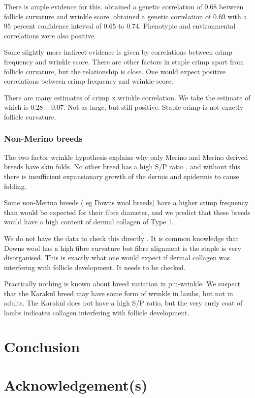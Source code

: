 \documentclass{article}
\begin{document}
There is ample evidence for this. \cite{jackson-1975} obtained a genetic correlation of 0.68 between follicle curvature and wrinkle score.  \cite{jackson-2017a} obtained a genetic correlation of 0.69 with a 95 percent confidence interval of 0.65 to 0.74. Phenotypic and environmental correlations were also positive.

Some slightly more indirect evidence is given by correlations between crimp frequency and wrinkle score. There are other factors in staple crimp apart from follicle curvature, but the relationship is close. One would expect positive correlations between crimp frequency and wrinkle score. 

There are many estimates  of crimp x wrinkle correlation. We take the estimate of \cite{brown-1968} which is $0.28 \pm 0.07$. Not as large, but still positive. Staple crimp is not exactly follicle curvature. 

\subsubsection{Non-Merino breeds}
The two factor wrinkle hypothesis explains why only Merino and Merino derived breeds have skin folds. No other breed has a high S/P ratio , and without this there is insufficient expansionary growth of the dermis and epidermis to cause folding. 

Some non-Merino breeds ( eg Downs wool breeds) have a higher crimp frequency than would be expected for their fibre diameter, and we predict that these breeds  would have a high content of dermal collagen of Type 1.

We do not have the data to check this directly . It is common knowledge that Downs wool has a high fibre curvature but fibre alignment is the staple is very disorganised. This is exactly what one would expect if dermal collagen was interfering with follicle development. It needs to be checked.

Practically nothing is known about breed variation in pin-wrinkle.  We suspect that the Karakul breed may have some form of wrinkle in lambs, but not in adults.   The Karakul does not have a high S/P ratio, but the very curly coat of lambs indicates collagen interfering with follicle development.


\section{Conclusion}


\section*{Acknowledgement(s)}



\end{document}
